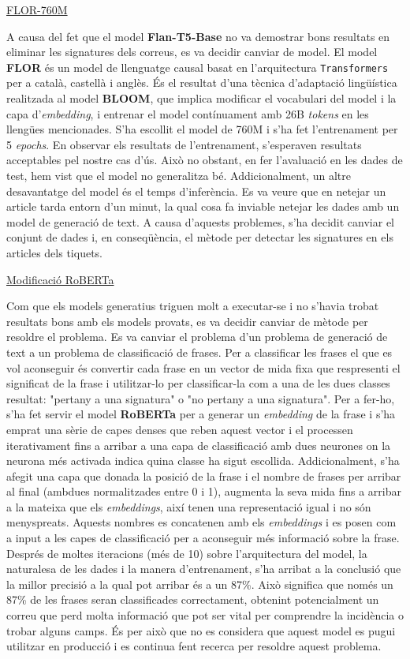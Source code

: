 \underline{FLOR-760M}

A causa del fet que el model \textbf{Flan-T5-Base} no va demostrar bons resultats en eliminar les signatures dels correus, es va decidir canviar de model. El model \textbf{FLOR} és un model de llenguatge causal basat en l'arquitectura \texttt{Transformers} per a català, castellà i anglès. És el resultat d'una tècnica d'adaptació lingüística realitzada al model \textbf{BLOOM}, que implica modificar el vocabulari del model i la capa d'\textit{embedding}, i entrenar el model contínuament amb 26B \textit{tokens} en les llengües mencionades. S'ha escollit el model de 760M i s'ha fet l'entrenament per 5 \textit{epochs}.
En observar els resultats de l'entrenament, s'esperaven resultats acceptables pel nostre cas d'ús. Això no obstant, en fer l'avaluació en les dades de test, hem vist que el model no generalitza bé. Addicionalment, un altre desavantatge del model és el temps d'inferència. Es va veure que en netejar un article tarda entorn d'un minut, la qual cosa fa inviable netejar les dades amb un model de generació de text.
A causa d'aquests problemes, s'ha decidit canviar el conjunt de dades i, en conseqüència, el mètode per detectar les signatures en els articles dels tiquets.

\underline{Modificació RoBERTa}

Com que els models generatius triguen molt a executar-se i no s'havia trobat resultats bons amb els models provats, es va decidir canviar de mètode per resoldre el problema. Es va canviar el problema d'un problema de generació de text a un problema de classificació de frases. Per a classificar les frases el que es vol aconseguir és convertir cada frase en un vector de mida fixa que respresenti el significat de la frase i utilitzar-lo per classificar-la com a una de les dues classes resultat: "pertany a una signatura" o "no pertany a una signatura". Per a fer-ho, s'ha fet servir el model \textbf{RoBERTa} per a generar un \textit{embedding} de la frase i s'ha emprat una sèrie de capes denses que reben aquest vector i el processen iterativament fins a arribar a una capa de classificació amb dues neurones on la neurona més activada indica quina classe ha sigut escollida.
Addicionalment, s'ha afegit una capa que donada la posició de la frase i el nombre de frases per arribar al final (ambdues normalitzades entre 0 i 1), augmenta la seva mida fins a arribar a la mateixa que els \textit{embeddings}, així tenen una representació igual i no són menyspreats. Aquests nombres es concatenen amb els \textit{embeddings} i es posen com a input a les capes de classificació per a aconseguir més informació sobre la frase.
Després de moltes iteracions (més de 10) sobre l'arquitectura del model, la naturalesa de les dades i la manera d'entrenament, s'ha arribat a la conclusió que la millor precisió a la qual pot arribar és a un 87\%. Això significa que només un 87\% de les frases seran classificades correctament, obtenint potencialment un correu que perd molta informació que pot ser vital per comprendre la incidència o trobar alguns camps. És per això que no es considera que aquest model es pugui utilitzar en producció i es continua fent recerca per resoldre aquest problema.

